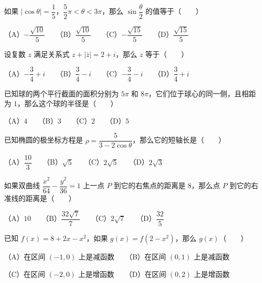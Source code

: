 \begin{question}

如果 $|\cos\theta|=\dfrac15$，$\dfrac52\pi<\theta<3\pi$，那么 $\sin\dfrac\theta2$ 的值等于\mbox{（　　）}

（A）$-\dfrac{\sqrt{10}}5$　　（B）$\dfrac{\sqrt{10}}5$　　（C）$-\dfrac{\sqrt{15}}5$　　（D）$\dfrac{\sqrt{15}}5$

\end{question}
\begin{question}

设复数 $z$ 满足关系式 $z+|\overline z|=2+i$，那么 $z$ 等于\mbox{（　　）}

（A）$-\dfrac34+i$　　（B）$\dfrac34-i$　　（C）$-\dfrac34-i$　　（D）$\dfrac34+i$

\end{question}
\begin{question}

已知球的两个平行截面的面积分别为 $5\pi$ 和 $8\pi$，它们位于球心的同一侧，且相距为 $1$，那么这个球的半径是\mbox{（　　）}

（A）$4$　　（B）$3$　　（C）$2$　　（D）$5$

\end{question}
\begin{question}

已知椭圆的极坐标方程是 $\rho=\dfrac5{3-2\cos\theta}$，那么它的短轴长是\mbox{（　　）}

（A）$\dfrac{10}3$　　（B）$\sqrt5$　　（C）$2\sqrt5$　　（D）$2\sqrt3$

\end{question}
\begin{question}

如果双曲线 $\dfrac{x^2}{64}-\dfrac{y^2}{36}=1$ 上一点 $P$ 到它的右焦点的距离是 $8$，那么点 $P$ 到它的右准线的距离是\mbox{（　　）}

（A）$10$　　（B）$\dfrac{32\sqrt7}{7}$　　（C）$2\sqrt7$　　（D）$\dfrac{32}{5}$

\end{question}
\begin{question}

已知 $f(x)=8+2x-x^2$，如果 $g(x)=f(2-x^2)$，那么 $g(x)$\mbox{（　　）}

（A）在区间 $(-1,0)$ 上是减函数　　（B）在区间 $(0,1)$ 上是减函数

（C）在区间 $(-2,0)$ 上是增函数　　（D）在区间 $(0,2)$ 上是增函数

\end{question}
